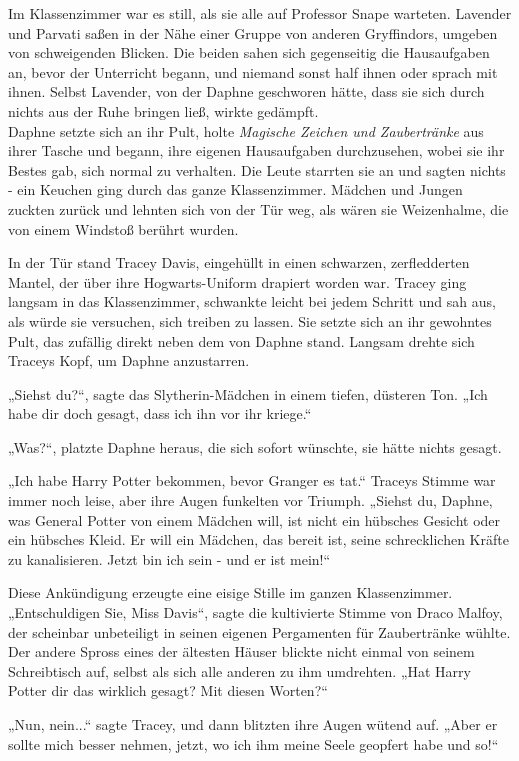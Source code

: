 {Im Klassenzimmer war es still, als sie alle auf Professor Snape warteten. Lavender und Parvati saßen in der Nähe einer Gruppe von anderen Gryffindors, umgeben von schweigenden Blicken. Die beiden sahen sich gegenseitig die Hausaufgaben an, bevor der Unterricht begann, und niemand sonst half ihnen oder sprach mit ihnen. Selbst Lavender, von der Daphne geschworen hätte, dass sie sich durch nichts aus der Ruhe bringen ließ, wirkte gedämpft.\\ Daphne setzte sich an ihr Pult, holte \emph{Magische Zeichen und Zaubertränke} aus ihrer Tasche und begann, ihre eigenen Hausaufgaben durchzusehen, wobei sie ihr Bestes gab, sich normal zu verhalten. Die Leute starrten sie an und sagten nichts - ein Keuchen ging durch das ganze Klassenzimmer. Mädchen und Jungen zuckten zurück und lehnten sich von der Tür weg, als wären sie Weizenhalme, die von einem Windstoß berührt wurden.

In der Tür stand Tracey Davis, eingehüllt in einen schwarzen, zerfledderten Mantel, der über ihre Hogwarts-Uniform drapiert worden war. Tracey ging langsam in das Klassenzimmer, schwankte leicht bei jedem Schritt und sah aus, als würde sie versuchen, sich treiben zu lassen. Sie setzte sich an ihr gewohntes Pult, das zufällig direkt neben dem von Daphne stand. Langsam drehte sich Traceys Kopf, um Daphne anzustarren.

„Siehst du?“, sagte das Slytherin-Mädchen in einem tiefen, düsteren Ton. „Ich habe dir doch gesagt, dass ich ihn vor ihr kriege.“

„Was?“, platzte Daphne heraus, die sich sofort wünschte, sie hätte nichts gesagt.

„Ich habe Harry Potter bekommen, bevor Granger es tat.“ Traceys Stimme war immer noch leise, aber ihre Augen funkelten vor Triumph. „Siehst du, Daphne, was General Potter von einem Mädchen will, ist nicht ein hübsches Gesicht oder ein hübsches Kleid. Er will ein Mädchen, das bereit ist, seine schrecklichen Kräfte zu kanalisieren. Jetzt bin ich sein - und er ist mein!“

Diese Ankündigung erzeugte eine eisige Stille im ganzen Klassenzimmer. „Entschuldigen Sie, Miss Davis“, sagte die kultivierte Stimme von Draco Malfoy, der scheinbar unbeteiligt in seinen eigenen Pergamenten für Zaubertränke wühlte. Der andere Spross eines der ältesten Häuser blickte nicht einmal von seinem Schreibtisch auf, selbst als sich alle anderen zu ihm umdrehten. „Hat Harry Potter dir das wirklich gesagt? Mit diesen Worten?“

„Nun, nein...“ sagte Tracey, und dann blitzten ihre Augen wütend auf. „Aber er sollte mich besser nehmen, jetzt, wo ich ihm meine Seele geopfert habe und so!“

}
